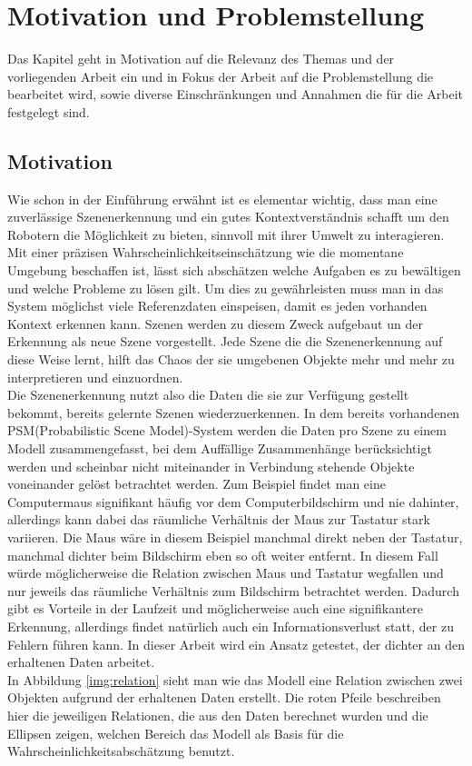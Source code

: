 \chapter{Motivation und Problemstellung}\label{ch:motivation}
Das Kapitel geht in Motivation auf die Relevanz des Themas und der vorliegenden Arbeit ein und in Fokus der Arbeit auf die Problemstellung die bearbeitet wird, sowie diverse Einschränkungen und Annahmen die für die Arbeit festgelegt sind.

\section{Motivation}
Wie schon in der Einführung erwähnt ist es elementar wichtig, dass man eine zuverlässige Szenenerkennung und ein gutes Kontextverständnis schafft um den Robotern die Möglichkeit zu bieten, sinnvoll mit ihrer Umwelt zu interagieren. Mit einer präzisen Wahrscheinlichkeitseinschätzung wie die momentane Umgebung beschaffen ist, lässt sich abschätzen welche Aufgaben es zu bewältigen und welche Probleme zu lösen gilt. Um dies zu gewährleisten muss man in das System möglichst viele Referenzdaten einspeisen, damit es jeden vorhanden Kontext erkennen kann. Szenen werden zu diesem Zweck aufgebaut un der Erkennung als neue Szene vorgestellt. Jede Szene die die Szenenerkennung auf diese Weise lernt, hilft das Chaos der sie umgebenen Objekte mehr und mehr zu interpretieren und einzuordnen.\smallskip\\
Die Szenenerkennung nutzt also die Daten die sie zur Verfügung gestellt bekommt, bereits gelernte Szenen wiederzuerkennen. In dem bereits vorhandenen PSM(Probabilistic Scene Model)-System werden die Daten pro Szene zu einem Modell zusammengefasst, bei dem Auffällige Zusammenhänge berücksichtigt werden und scheinbar nicht miteinander in Verbindung stehende Objekte voneinander gelöst betrachtet werden. Zum Beispiel findet man eine Computermaus signifikant häufig vor dem Computerbildschirm und nie dahinter, allerdings kann dabei das räumliche Verhältnis der Maus zur Tastatur stark variieren. Die Maus wäre in diesem Beispiel manchmal direkt neben der Tastatur, manchmal dichter beim Bildschirm eben so oft weiter entfernt. In diesem Fall würde möglicherweise die Relation zwischen Maus und Tastatur wegfallen und nur jeweils das räumliche Verhältnis zum Bildschirm betrachtet werden. Dadurch gibt es Vorteile in der Laufzeit und möglicherweise auch eine signifikantere Erkennung, allerdings findet natürlich auch ein Informationsverlust statt, der zu Fehlern führen kann. In dieser Arbeit wird ein Ansatz getestet, der dichter an den erhaltenen Daten arbeitet.\smallskip\\
In Abbildung \ref{img:relation} sieht man wie das Modell eine Relation zwischen zwei Objekten aufgrund der erhaltenen Daten erstellt. Die roten Pfeile beschreiben hier die jeweiligen Relationen, die aus den Daten berechnet wurden und die Ellipsen zeigen, welchen Bereich das Modell als Basis für die Wahrscheinlichkeitsabschätzung benutzt.
\begin{deprecated}
\cite{gehrung14}
\end{deprecated}

